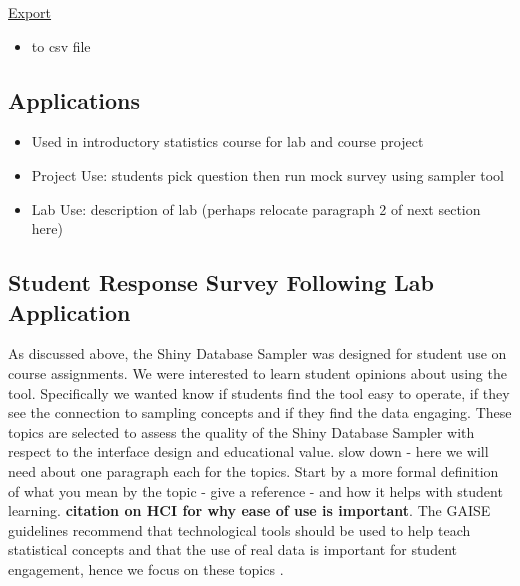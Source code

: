 \documentclass{article}\usepackage[]{graphicx}\usepackage[]{color}
\newcommand{\hh}[1]{{\color{ForestGreen} #1}}
\newcommand{\km}[1]{{\color{Orange} #1}}
\begin{document}
\vspace{.1in}

\underline{Export}
\begin{itemize}
\item to csv file
\end{itemize}

\vspace{.1in}

\subsection{Applications}

\begin{itemize}
\item Used in introductory statistics course for lab and course project
\item Project Use: students pick question then run mock survey using sampler tool
\item Lab Use: description of lab (perhaps relocate paragraph 2 of next section here)
\end{itemize}

\subsection{Student Response Survey Following Lab Application}

As discussed above, the Shiny Database Sampler was designed for student use on course assignments. We were interested to learn student opinions about using the tool. Specifically we wanted know if students find the tool easy to operate, if they see the connection to sampling concepts and if they find the data engaging. \km{These topics are selected to assess the quality of the Shiny Database Sampler with respect to the interface design and educational value.}
\hh{slow down - here we will need about one paragraph each for the topics. Start by a more formal definition of what you mean by the topic - give a reference - and how it helps with student learning. }
\km{\textbf{citation on HCI for why ease of use is important}.  The GAISE guidelines recommend that technological tools should be used to help teach statistical concepts and that the use of real data is important for student engagement, hence we focus on these topics \citep{GAISEcollege}. } \\
\end{document}
